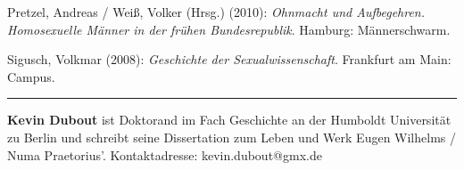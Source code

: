 \documentclass[a4paper,
fontsize=11pt,
oneside,
numbers=noperiodatend,
parskip=half-,
bibliography=totoc,
final
]{scrartcl}
\begin{document}
Pretzel, Andreas / Weiß, Volker (Hrsg.) (2010): \emph{Ohnmacht und
Aufbegehren. Homosexuelle Männer in der frühen Bundesrepublik}. Hamburg:
Männerschwarm.

Sigusch, Volkmar (2008): \emph{Geschichte der Sexualwissenschaft}.
Frankfurt am Main: Campus.

\begin{center}\rule{0.5\linewidth}{\linethickness}\end{center}

\textbf{Kevin Dubout} ist Doktorand im Fach Geschichte an der Humboldt
Universität zu Berlin und schreibt seine Dissertation zum Leben und Werk
Eugen Wilhelms / Numa Praetorius'. Kontaktadresse: kevin.dubout@gmx.de
\end{document}
